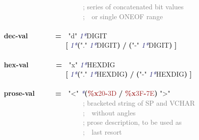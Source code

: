 \documentclass{article}
\begin{document}
{\mbox{~~~~~~~~~~~~~~~~~~~~~~~}\textcolor{Gray}{; series of concatenated bit values}\\
\mbox{~~~~~~~~~~~~~~~~~~~~~~~}\textcolor{Gray}{;\mbox{~~}or single ONEOF range}\\
\\
\textbf{dec-val}\mbox{~~~~~~~~}\textbf{=}\mbox{~~}\textcolor{BrickRed}{"d"} \textcolor{MidnightBlue}{\emph{1*}}DIGIT\\
\mbox{~~~~~~~~~~~~~~~~~~}\textbf{[} \textcolor{MidnightBlue}{\emph{1*}}\textbf{(}\textcolor{BrickRed}{"."} \textcolor{MidnightBlue}{\emph{1*}}DIGIT\textbf{)} \textbf{/} \textbf{(}\textcolor{BrickRed}{"-"} \textcolor{MidnightBlue}{\emph{1*}}DIGIT\textbf{)} \textbf{]}\\
\\
\textbf{hex-val}\mbox{~~~~~~~~}\textbf{=}\mbox{~~}\textcolor{BrickRed}{"x"} \textcolor{MidnightBlue}{\emph{1*}}HEXDIG\\
\mbox{~~~~~~~~~~~~~~~~~~}\textbf{[} \textcolor{MidnightBlue}{\emph{1*}}\textbf{(}\textcolor{BrickRed}{"."} \textcolor{MidnightBlue}{\emph{1*}}HEXDIG\textbf{)} \textbf{/} \textbf{(}\textcolor{BrickRed}{"-"} \textcolor{MidnightBlue}{\emph{1*}}HEXDIG\textbf{)} \textbf{]}\\
\\
\textbf{prose-val}\mbox{~~~~~~}\textbf{=}\mbox{~~}\textcolor{BrickRed}{"\textless{}"} \textcolor{MidnightBlue}{\emph{*}}\textbf{(}\textcolor{Brown}{\textbf{\%{}x}20\textbf{-}3D} \textbf{/} \textcolor{Brown}{\textbf{\%{}x}3F\textbf{-}7E}\textbf{)} \textcolor{BrickRed}{"\textgreater{}"}\\
\mbox{~~~~~~~~~~~~~~~~~~~~~~~}\textcolor{Gray}{; bracketed string of SP and VCHAR}\\
\mbox{~~~~~~~~~~~~~~~~~~~~~~~}\textcolor{Gray}{;\mbox{~~}without angles}\\
\mbox{~~~~~~~~~~~~~~~~~~~~~~~}\textcolor{Gray}{; prose description, to be used as}\\
\mbox{~~~~~~~~~~~~~~~~~~~~~~~}\textcolor{Gray}{;\mbox{~~}last resort}\\
\\

}
\end{document}
